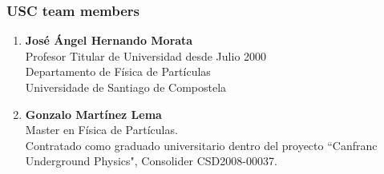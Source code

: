 %
%

\subsubsection*{USC team members}


\begin{enumerate}

\item {\bf Jos\'e \'Angel Hernando Morata} \\ Profesor Titular de Universidad desde Julio 2000 \\
 Departamento de F\'isica de Part\'iculas \\
 Universidade de Santiago de Compostela

\item {\bf Gonzalo Mart\'inez Lema} \\ 
Master en F\'isica de Part\'iculas.  \\
Contratado como graduado universitario dentro del  proyecto ``Canfranc Underground Physics", Consolider CSD2008-00037. 

\end{enumerate}
